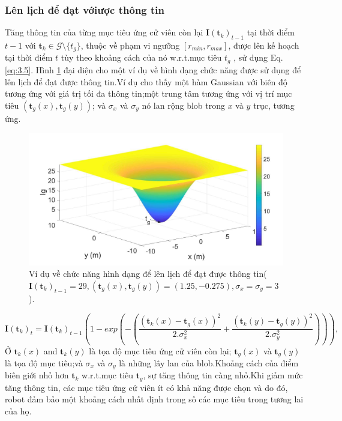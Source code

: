 \documentclass[11pt,openany]{book}
\begin{document}
\begin{algorimth}[H]
\subsubsection{Lên lịch để đạt vớiược thông tin}
Tăng thông tin của từng mục tiêu ứng cử viên còn lại $\mathbf{I}(\mathbf{t}_k)_{t-1}$ tại thời điểm $t-1$ với $\mathbf{t}_k \in \mathcal{G} \setminus \{t_g\}$, thuộc về phạm vi ngưỡng $[r_{min} , r_{max} ]$, được lên kế hoạch tại thời điểm $ t $ tùy theo khoảng cách của nó w.r.t.mục tiêu $t_g$ , sử dụng Eq. \ref{eq:3.5}. Hình \ref{fig:3.9} đại diện cho một ví dụ về hình dạng chức năng được sử dụng để lên lịch để đạt được thông tin.Ví dụ cho thấy một hàm Gaussian với biên độ tương ứng với giá trị tối đa thông tin;một trung tâm tương ứng với vị trí mục tiêu $(\mathbf{t}_g(x), \mathbf{t}_g(y))$; và $\sigma_x$ và $\sigma_y$ nó lan rộng blob trong $x$ và $y$ trục, tương ứng.
\begin{figure}[H]
    \centering
    \includegraphics[scale=0.6]{assets/3_9.png}
    \caption{Ví dụ về chức năng hình dạng để lên lịch để đạt được thông tin($\mathbf{I}(\mathbf{t}_k)_{t-1}=29,(\mathbf{t}_g(x),\mathbf{t}_g(y))=(1.25,-0.275), \sigma_x=\sigma_y=3$).}
    \label{fig:3.9}
\end{figure}
\begin{equation}\label{eq:3.5}
    \mathbf{I}(\mathbf{t}_k)_t=\mathbf{I}(\mathbf{t}_k)_{t-1}(1-exp(-(\frac{(\mathbf{t}_k(x)-\mathbf{t}_g(x))^2}{2.\sigma_x^2}+\frac{(\mathbf{t}_k(y)-\mathbf{t}_g(y))^2}{2.\sigma_y^2}))),
\end{equation}
Ở $\mathbf{t}_k(x)$ and $\mathbf{t}_k(y)$ là tọa độ mục tiêu ứng cử viên còn lại; $\mathbf{t}_g(x)$ và $\mathbf{t}_g(y)$ là tọa độ mục tiêu;và $\sigma_x$ và $\sigma_y$ là những lây lan của blob.Khoảng cách của điểm biên giới nhỏ hơn $\mathbf{t}_k$ w.r.t.mục tiêu $\mathbf{t}_g$, sự tăng thông tin càng nhỏ.Khi giảm mức tăng thông tin, các mục tiêu ứng cử viên ít có khả năng được chọn và do đó, robot đảm bảo một khoảng cách nhất định trong số các mục tiêu trong tương lai của họ.

\end{algorimth}
\end{document}
